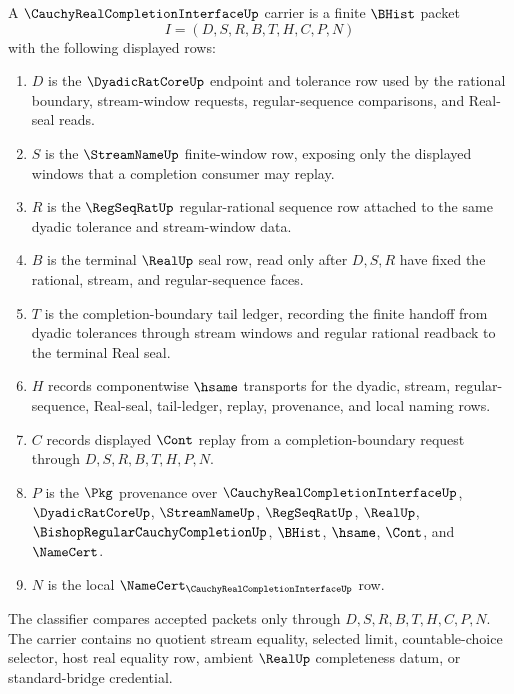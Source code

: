 \begin{definition}
\label{def:cauchy-real-completion-interface-carrier}
A $\CauchyRealCompletionInterfaceUp$ carrier is a finite $\BHist$ packet
$$
I=(D,S,R,B,T,H,C,P,N)
$$
with the following displayed rows:
\begin{enumerate}
\item $D$ is the $\DyadicRatCoreUp$ endpoint and tolerance row used by the rational boundary, stream-window requests, regular-sequence comparisons, and Real-seal reads.
\item $S$ is the $\StreamNameUp$ finite-window row, exposing only the displayed windows that a completion consumer may replay.
\item $R$ is the $\RegSeqRatUp$ regular-rational sequence row attached to the same dyadic tolerance and stream-window data.
\item $B$ is the terminal $\RealUp$ seal row, read only after $D,S,R$ have fixed the rational, stream, and regular-sequence faces.
\item $T$ is the completion-boundary tail ledger, recording the finite handoff from dyadic tolerances through stream windows and regular rational readback to the terminal Real seal.
\item $H$ records componentwise $\hsame$ transports for the dyadic, stream, regular-sequence, Real-seal, tail-ledger, replay, provenance, and local naming rows.
\item $C$ records displayed $\Cont$ replay from a completion-boundary request through $D,S,R,B,T,H,P,N$.
\item $P$ is the $\Pkg$ provenance over $\CauchyRealCompletionInterfaceUp$, $\DyadicRatCoreUp$, $\StreamNameUp$, $\RegSeqRatUp$, $\RealUp$, $\BishopRegularCauchyCompletionUp$, $\BHist$, $\hsame$, $\Cont$, and $\NameCert$.
\item $N$ is the local $\NameCert_{\CauchyRealCompletionInterfaceUp}$ row.
\end{enumerate}
The classifier compares accepted packets only through $D,S,R,B,T,H,C,P,N$. The carrier contains no quotient stream equality, selected limit, countable-choice selector, host real equality row, ambient $\RealUp$ completeness datum, or standard-bridge credential.
\end{definition}

